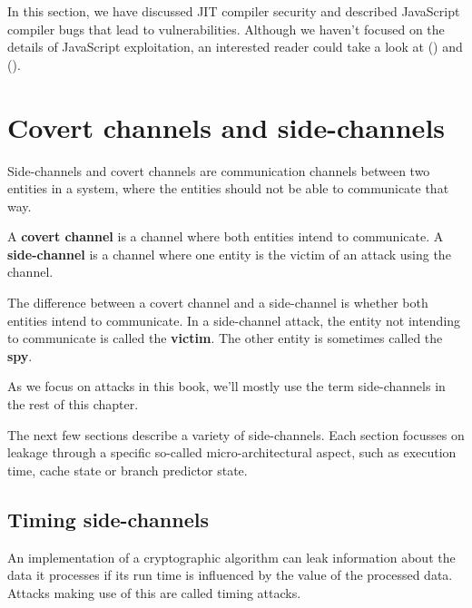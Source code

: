 \documentclass[
  a4paper,
]{report}
\begin{document}
In this section, we have discussed JIT compiler security and described
JavaScript compiler bugs that lead to vulnerabilities. Although we
haven't focused on the details of JavaScript exploitation, an interested
reader could take a look at () and
().

\chapter{Covert channels and
side-channels}\label{covert-channels-and-side-channels}

Side-channels and covert channels are communication channels between two
entities in a system, where the entities should not be able to
communicate that way.

A \textbf{\label{__index_entry_99}{covert
channel}} is a channel where both entities intend
to communicate. A
\textbf{\label{__index_entry_100}{side-channel}}
is a channel where one entity is the victim of an attack using the
channel.

The difference between a covert channel and a side-channel is whether
both entities intend to communicate. In a side-channel attack, the
entity not intending to communicate is called the
\textbf{\label{__index_entry_101}{victim}}.
The other entity is sometimes called the
\textbf{\label{__index_entry_102}{spy}}.

As we focus on attacks in this book, we'll mostly use the term
side-channels in the rest of this chapter.

The next few sections describe a variety of side-channels. Each section
focusses on leakage through a specific so-called
\label{__index_entry_103}{micro-architectural}
aspect, such as execution time, cache state or branch predictor state.

\section{Timing side-channels}\label{timing-side-channels}

An implementation of a cryptographic algorithm can leak information
about the data it processes if its run time is influenced by the value
of the processed data. Attacks making use of this are called
\label{__index_entry_104}{timing
attacks}.
\end{document}

